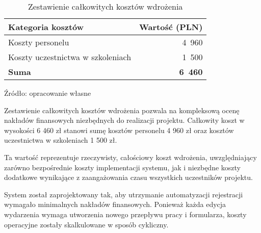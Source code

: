 \begin{table}[ht]
    \centering
    \caption[Całkowite koszty wdrożenia, źródło: opracowanie własne]{Zestawienie całkowitych kosztów wdrożenia}
    \label{tab:calkowite_koszty_wdrozenia}
    \renewcommand{\arraystretch}{1.3} %
    \begin{tabular}{| p{} | r |}
        \hline
        \textbf{Kategoria kosztów} & \textbf{Wartość (PLN)} \\
        \hline
        Koszty personelu & 4~960 \\
        \hline
        Koszty uczestnictwa w szkoleniach & 1~500 \\
        \hline
        \textbf{Suma} & \textbf{6~460} \\
        \hline
    \end{tabular}
    \vspace{0.5em}
    \par\raggedright\footnotesize{Źródło: opracowanie własne}
\end{table}

Zestawienie całkowitych kosztów wdrożenia pozwala na kompleksową ocenę nakładów finansowych niezbędnych do realizacji projektu. Całkowity koszt w wysokości 6 460 zł stanowi sumę kosztów personelu 4 960 zł oraz kosztów uczestnictwa w szkoleniach 1 500 zł.

Ta wartość reprezentuje rzeczywisty, całościowy koszt wdrożenia, uwzględniający zarówno bezpośrednie koszty implementacji systemu, jak i niezbędne koszty dodatkowe wynikające z zaangażowania czasu wszystkich uczestników projektu. 

System został zaprojektowany tak, aby utrzymanie automatyzacji rejestracji wymagało minimalnych nakładów finansowych. Ponieważ każda edycja wydarzenia wymaga utworzenia nowego przepływu pracy i formularza, koszty operacyjne zostały skalkulowane w sposób cykliczny.

